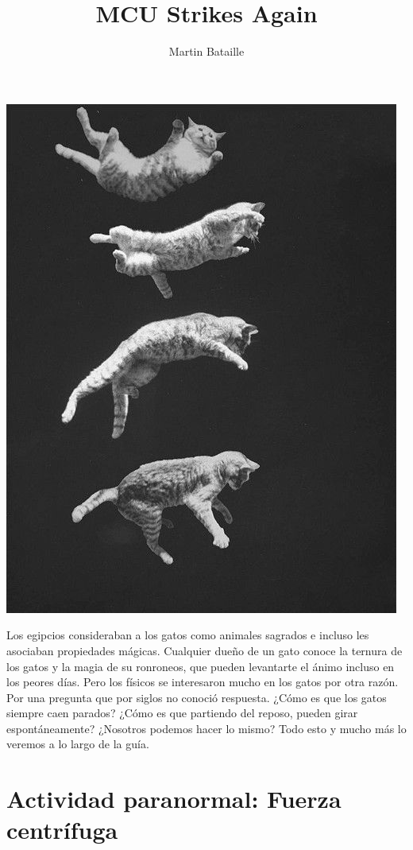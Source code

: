 \documentclass[letterpaper]{article}
\author{Martin Bataille}
\date{}
\title{\bf MCU Strikes Again}
\newcounter{propiedades}
\begin{document}
\maketitle
\thispagestyle{fancy}
\begin{center}
\includegraphics[scale=0.6]{portada.jpg}
\end{center}
\pagebreak

Los egipcios consideraban a los gatos como animales sagrados e incluso les asociaban propiedades mágicas. Cualquier dueño de un gato conoce la ternura de los gatos y la magia de su ronroneos, que pueden levantarte el ánimo incluso en los peores días. Pero los físicos se interesaron mucho en los gatos por otra razón. Por una pregunta que por siglos no conoció respuesta. ¿Cómo es que los gatos siempre caen parados? ¿Cómo es que partiendo del reposo, pueden girar espontáneamente? ¿Nosotros podemos hacer lo mismo? Todo esto y mucho más lo veremos a lo largo de la guía.  


\section*{Actividad paranormal: Fuerza centrífuga}
\end{document}
